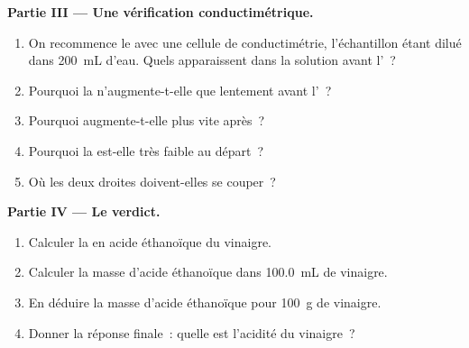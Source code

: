 \begin{problem}
\medskip
\noindent\textbf{Partie III --- Une vérification conductimétrique.}
\begin{enumerate}[resume]
  \item On recommence le  avec une cellule de conductimétrie,
        l'échantillon étant dilué dans \qty{200}{mL} d'eau. Quels 
        apparaissent dans la solution avant l'~?
  \item Pourquoi la  n'augmente-t-elle que lentement avant
        l'~?
  \item Pourquoi augmente-t-elle plus vite après~?
  \item Pourquoi la  est-elle très faible au départ~?
  \item Où les deux droites doivent-elles se couper~?
\end{enumerate}

\medskip
\noindent\textbf{Partie IV --- Le verdict.}
\begin{enumerate}[resume]
  \item Calculer la  en acide éthanoïque du
        vinaigre.
  \item Calculer la masse d'acide éthanoïque dans \qty{100.0}{mL} de
        vinaigre.
  \item En déduire la masse d'acide éthanoïque pour \qty{100}{g} de
        vinaigre.
  \item Donner la réponse finale~: quelle est l'acidité du vinaigre~?
\end{enumerate}
\end{problem}
